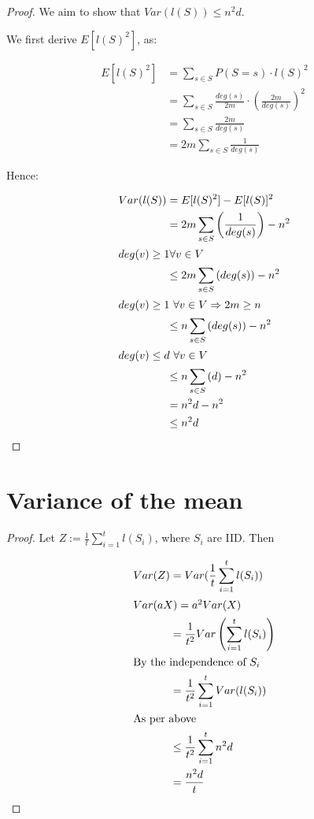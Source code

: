 \documentclass[a4paper]{scrreprt}
\begin{document}
\begin{proof}
  We aim to show that $Var(l(S)) \leq n^2d$.

  We first derive $E[l(S)^2]$, as:

  \begin{align*}
    E[l(S)^2] & = \sum_{s \in S}{P(S = s) \cdot l(S)^2} \\
    & = \sum_{s \in S}{\frac{deg(s)}{2m} \cdot \left(\frac{2m}{deg(s)}\right)^2} \\
    & = \sum_{s \in S}{\frac{2m}{deg(s)}} \\
    & = 2m \sum_{s \in S}{\frac{1}{deg(s)}}
  \end{align*}

  Hence:

  \begin{align*}
    Var(l(S)) & = E[l(S)^2] - E[l(S)]^2 \\
              & = 2m \sum_{s \in S}{\left(\frac{1}{deg(s)}\right)} - n^2 \\
    \intertext{$deg(v) \geq 1 \forall v \in V$}
    & \leq 2m \sum_{s \in S}{(deg(s))} - n^2 \\
    \intertext{$deg(v) \geq 1\ \forall v \in V \Rightarrow 2m \geq n$}
    & \leq n \sum_{s \in S}{(deg(s))} - n^2 \\
    \intertext{$deg(v) \leq d\ \forall v \in V$}
    & \leq n \sum_{s \in S}{(d)} - n^2 \\
    & = n^2 d - n^2 \\
    & \leq n^2 d
  \end{align*}
\end{proof}

\section{Variance of the mean}

\begin{proof}
  Let $Z := \frac{1}{t} \sum_{i=1}^t{l(S_i)}$, where $S_i$ are IID. Then

  \begin{align*}
    Var(Z) & = Var(\frac{1}{t} \sum_{i=1}^t{l(S_i)}) \\
    \intertext{$Var(aX) = a^2 Var(X)$}
    & = \frac{1}{t^2} Var\left(\sum_{i=1}^t{l(S_i)}\right) \\
    \intertext{By the independence of $S_i$}
    & = \frac{1}{t^2} \sum_{i=1}^t{Var(l(S_i))} \\
    \intertext{As per above}
    & \leq \frac{1}{t^2} \sum_{i=1}^t{n^2 d} \\
    & = \frac{n^2 d}{t}
  \end{align*}
\end{proof}
\end{document}
